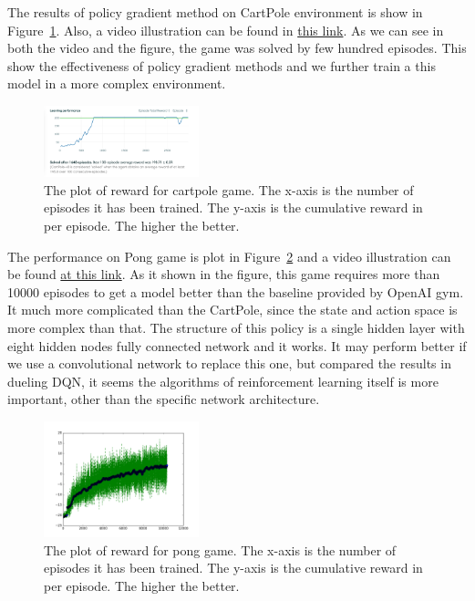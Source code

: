 
The results of policy gradient method on CartPole environment is show
in Figure~\ref{fig:pg_cartpole}. Also, a video illustration can be found
in \href{https://gym.openai.com/evaluations/eval_UaXIaMm1QxPGgW45KHtTA#reproducibility}{this link}.
As we can see in both the video and the figure, the game was solved by 
few hundred episodes. This show the effectiveness of policy gradient methods
and we further train a this model in a more complex environment. 

\begin{figure}[h!]
\centering
\includegraphics[width=0.4\textwidth]{./fig/pg_cartpole.png} 
\caption{The plot of reward for cartpole game. The x-axis is the number
of episodes it has been trained. The y-axis is the cumulative reward in 
per episode. The higher the better. }
\label{fig:pg_cartpole}
\end{figure}


The performance on Pong game is plot in Figure~\ref{fig:pg_pong} and a video
illustration can be found \href{https://gym.openai.com/evaluations/eval_dODFoXO2S4y5TuUZMX7Nw}{at this link}. As it
shown in the figure, this game requires more than 10000 episodes to get 
a model better than the baseline provided by OpenAI gym. It much more complicated
than the CartPole, since the state and action space is more complex than 
that. The structure of this policy is a single hidden layer with eight
hidden nodes fully connected network and it works. It may perform
better if we use a convolutional network to replace this one, but compared 
the results in dueling DQN, it seems the algorithms of reinforcement learning
itself is more important, other than the specific network architecture. 

\begin{figure}[h!]
\centering
\includegraphics[width=0.4\textwidth]{./fig/pg_pong_rewardsplot.png} 
\caption{The plot of reward for pong game. The x-axis is the number
of episodes it has been trained. The y-axis is the cumulative reward in 
per episode. The higher the better. }
\label{fig:pg_pong}
\end{figure}
